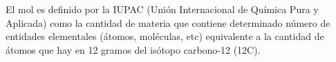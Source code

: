 \begin{warncard}[adjusted title={El Mol y la UMA}]
    El mol es definido por la IUPAC (Unión Internacional de Química Pura y Aplicada) como la cantidad de materia que contiene determinado número de entidades elementales (átomos, moléculas, etc) equivalente a la cantidad de átomos que hay en 12 gramos del isótopo carbono-12 (12C).
\end{warncard}